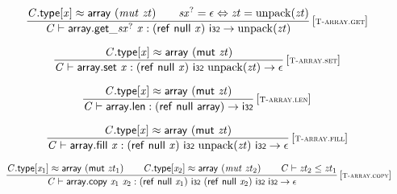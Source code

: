 $$
\begin{array}{@{}c@{}}\displaystyle
\frac{
{\mathit{C}}.\mathsf{type}[{\mathit{x}}] \approx \mathsf{array}~({\mathit{mut}}~{\mathit{zt}})
 \qquad
{{\mathit{sx}}^?} = \epsilon \Leftrightarrow {\mathit{zt}} = {\mathrm{unpack}}({\mathit{zt}})
}{
{\mathit{C}} \vdash {{\mathsf{array.get}}{\mathsf{\_}}}{{{\mathit{sx}}^?}}~{\mathit{x}} : (\mathsf{ref}~\mathsf{null}~{\mathit{x}})~\mathsf{i{\scriptstyle32}} \rightarrow {\mathrm{unpack}}({\mathit{zt}})
} \, {[\textsc{\scriptsize T{-}array.get}]}
\qquad
\end{array}
$$

$$
\begin{array}{@{}c@{}}\displaystyle
\frac{
{\mathit{C}}.\mathsf{type}[{\mathit{x}}] \approx \mathsf{array}~(\mathsf{mut}~{\mathit{zt}})
}{
{\mathit{C}} \vdash \mathsf{array.set}~{\mathit{x}} : (\mathsf{ref}~\mathsf{null}~{\mathit{x}})~\mathsf{i{\scriptstyle32}}~{\mathrm{unpack}}({\mathit{zt}}) \rightarrow \epsilon
} \, {[\textsc{\scriptsize T{-}array.set}]}
\qquad
\end{array}
$$

$$
\begin{array}{@{}c@{}}\displaystyle
\frac{
{\mathit{C}}.\mathsf{type}[{\mathit{x}}] \approx \mathsf{array}~(\mathsf{mut}~{\mathit{zt}})
}{
{\mathit{C}} \vdash \mathsf{array.len} : (\mathsf{ref}~\mathsf{null}~\mathsf{array}) \rightarrow \mathsf{i{\scriptstyle32}}
} \, {[\textsc{\scriptsize T{-}array.len}]}
\qquad
\end{array}
$$

$$
\begin{array}{@{}c@{}}\displaystyle
\frac{
{\mathit{C}}.\mathsf{type}[{\mathit{x}}] \approx \mathsf{array}~(\mathsf{mut}~{\mathit{zt}})
}{
{\mathit{C}} \vdash \mathsf{array.fill}~{\mathit{x}} : (\mathsf{ref}~\mathsf{null}~{\mathit{x}})~\mathsf{i{\scriptstyle32}}~{\mathrm{unpack}}({\mathit{zt}})~\mathsf{i{\scriptstyle32}} \rightarrow \epsilon
} \, {[\textsc{\scriptsize T{-}array.fill}]}
\qquad
\end{array}
$$

$$
\begin{array}{@{}c@{}}\displaystyle
\frac{
{\mathit{C}}.\mathsf{type}[{\mathit{x}}_{{1}}] \approx \mathsf{array}~(\mathsf{mut}~{\mathit{zt}}_{{1}})
 \qquad
{\mathit{C}}.\mathsf{type}[{\mathit{x}}_{{2}}] \approx \mathsf{array}~({\mathit{mut}}~{\mathit{zt}}_{{2}})
 \qquad
{\mathit{C}} \vdash {\mathit{zt}}_{{2}} \leq {\mathit{zt}}_{{1}}
}{
{\mathit{C}} \vdash \mathsf{array.copy}~{\mathit{x}}_{{1}}~{\mathit{x}}_{{2}} : (\mathsf{ref}~\mathsf{null}~{\mathit{x}}_{{1}})~\mathsf{i{\scriptstyle32}}~(\mathsf{ref}~\mathsf{null}~{\mathit{x}}_{{2}})~\mathsf{i{\scriptstyle32}}~\mathsf{i{\scriptstyle32}} \rightarrow \epsilon
} \, {[\textsc{\scriptsize T{-}array.copy}]}
\qquad
\end{array}
$$

